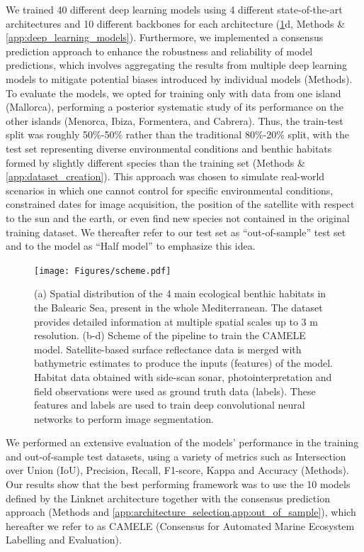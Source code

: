 We trained 40 different deep learning models using 4
different state-of-the-art architectures and 10 different backbones for each
architecture (\cref{fig:scheme}d, Methods \& \cref{app:deep_learning_models}).
Furthermore, we implemented a consensus prediction approach to enhance the
robustness and reliability of model predictions, which involves aggregating the
results from multiple deep learning models to mitigate potential biases
introduced by individual models (Methods). To evaluate the models, we opted for
training only with data from
one island (Mallorca), performing a posterior systematic study of its
performance on the other islands (Menorca, Ibiza, Formentera, and Cabrera).
Thus, the train-test split was roughly 50\%-50\% rather than the traditional
80\%-20\% split, with the test set representing diverse environmental
conditions and benthic habitats formed by slightly different species than
the training set (Methods \& \cref{app:dataset_creation}). This approach
was chosen to simulate real-world scenarios in which one cannot control for
specific environmental conditions, constrained dates for image acquisition, the
position of the satellite with respect to the sun and the earth, or even find
new species not contained in the original training dataset. We thereafter refer
to our test set as ``out-of-sample'' test set and to the model as ``Half
model'' to emphasize this idea.

\begin{figure}[H]
    \centering
    \texttt{[image: Figures/scheme.pdf]}
    \caption[AI framework for seagrass monitoring from satellite imagery]{(a)
        Spatial distribution of the 4 main ecological benthic habitats
        in the Balearic Sea, present in the whole Mediterranean. The dataset
        provides detailed information at multiple spatial scales up to 3 m
        resolution. (b-d) Scheme of the pipeline to train the CAMELE model.
        Satellite-based surface reflectance data is merged with bathymetric
        estimates to produce the inputs (features) of the model. Habitat data
        obtained with side-scan sonar, photointerpretation and field
        observations were used as ground truth data (labels). These features
        and labels are used to train deep convolutional neural networks to
        perform image segmentation.}
    \label{fig:scheme}
\end{figure}

We performed an extensive evaluation of the models' performance in the
training and out-of-sample test datasets, using a variety of metrics such as
Intersection over Union (IoU), Precision, Recall, F1-score, Kappa and Accuracy
(Methods). Our results show that the best performing framework was to use the
10 models defined by the Linknet architecture together with the consensus
prediction approach (Methods and
\cref{app:architecture_selection,app:out_of_sample}), which hereafter we
refer to as CAMELE (Consensus for Automated Marine Ecosystem Labelling and
Evaluation).

